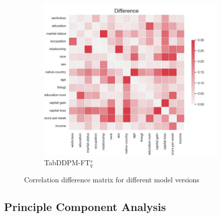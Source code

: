 \begin{figure}[h]
\begin{subfigure}{0.3\textwidth}
    \end{subfigure}
	\begin{subfigure}{0.3\textwidth}
		\includegraphics[width=\textwidth]{images/correlation_difference/tab-ddpm-ft-simTune.jpg}
		\caption{TabDDPM-FT$^{s}_q$}
    \end{subfigure}
    \caption{Correlation difference matrix for different model versions}
	\label{fig_a:corr_diff}
\end{figure}

\newpage
\subsection[]{Principle Component Analysis}
\label{A:pca}

